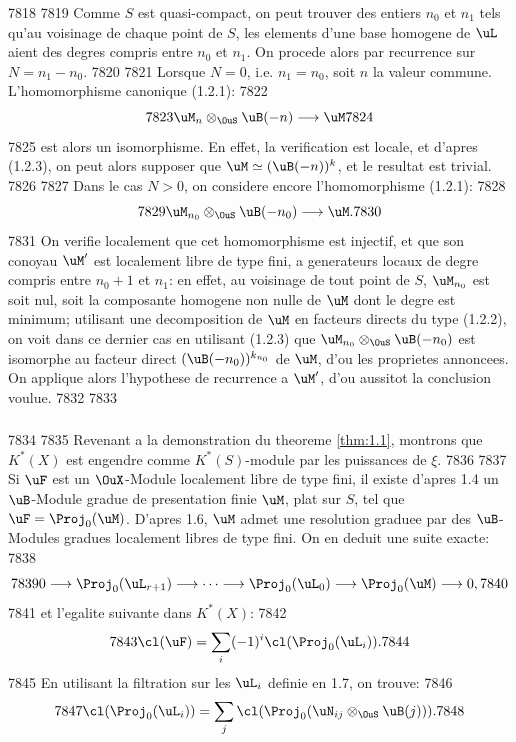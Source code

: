   7818	
  7819	Comme $S$ est quasi-compact, on peut trouver des entiers $n_0$ et $n_1$ tels qu'au voisinage de chaque point de $S$, les elements d'une base homogene de $\uL$ aient des degres compris entre $n_0$ et $n_1$. On procede alors par recurrence sur $N = n_1 - n_0$.
  7820	
  7821	Lorsque $N = 0$, i.e. $n_1 = n_0$, soit $n$ la valeur commune. L'homomorphisme canonique (1.2.1):
  7822	\[
  7823	\uM_n \otimes_{\OuS} \uB(-n) \longrightarrow \uM
  7824	\]
  7825	est alors un isomorphisme. En effet, la verification est locale, et d'apres (1.2.3), on peut alors supposer que $\uM \simeq (\uB(-n))^k$, et le resultat est trivial.
  7826	
  7827	Dans le cas $N > 0$, on considere encore l'homomorphisme (1.2.1):
  7828	\[
  7829	\uM_{n_0} \otimes_{\OuS} \uB(-n_0) \longrightarrow \uM.
  7830	\]
  7831	On verifie localement que cet homomorphisme est injectif, et que son conoyau $\uM'$ est localement libre de type fini, a generateurs locaux de degre compris entre $n_0+1$ et $n_1$: en effet, au voisinage de tout point de $S$, $\uM_{n_0}$ est soit nul, soit la composante homogene non nulle de $\uM$ dont le degre est minimum; utilisant une decomposition de $\uM$ en facteurs directs du type (1.2.2), on voit dans ce dernier cas en utilisant (1.2.3) que $\uM_{n_0} \otimes_{\OuS} \uB(-n_0)$ est isomorphe au facteur direct $(\uB(-n_0))^{k_{n_0}}$ de $\uM$, d'ou les proprietes annoncees. On applique alors l'hypothese de recurrence a $\uM'$, d'ou aussitot la conclusion voulue.
  7832	
  7833	\subsubsection{}
  7834	
  7835	Revenant a la demonstration du theoreme \ref{thm:1.1}, montrons que $K^*(X)$ est engendre comme $K^*(S)$-module par les puissances de $\xi$.
  7836	
  7837	Si $\uF$ est un $\OuX$-Module localement libre de type fini, il existe d'apres 1.4 un $\uB$-Module gradue de presentation finie $\uM$, plat sur $S$, tel que $\uF = \Proj_0(\uM)$. D'apres 1.6, $\uM$ admet une resolution graduee par des $\uB$-Modules gradues localement libres de type fini. On en deduit une suite exacte:
  7838	\[
  7839	0 \longrightarrow \Proj_0(\uL_{r+1}) \longrightarrow \cdots \longrightarrow \Proj_0(\uL_0) \longrightarrow \Proj_0(\uM) \longrightarrow 0,
  7840	\]
  7841	et l'egalite suivante dans $K^*(X)$:
  7842	\[
  7843	\cl(\uF) = \sum_i (-1)^i \cl(\Proj_0(\uL_i)).
  7844	\]
  7845	En utilisant la filtration sur les $\uL_i$ definie en 1.7, on trouve:
  7846	\[
  7847	\cl(\Proj_0(\uL_i)) = \sum_j \cl(\Proj_0(\uN_{ij} \otimes_{\OuS} \uB(j))).
  7848	\]
